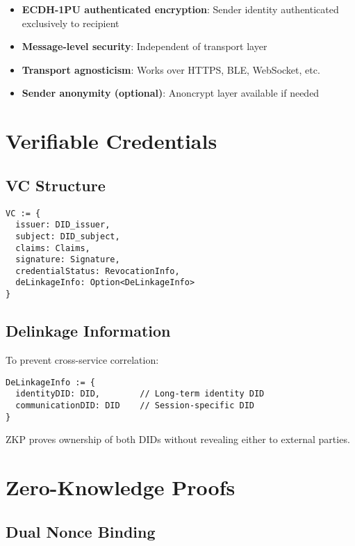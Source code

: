 \begin{itemize}
  \item \textbf{ECDH-1PU authenticated encryption}: Sender identity authenticated exclusively to recipient
  \item \textbf{Message-level security}: Independent of transport layer
  \item \textbf{Transport agnosticism}: Works over HTTPS, BLE, WebSocket, etc.
  \item \textbf{Sender anonymity (optional)}: Anoncrypt layer available if needed
\end{itemize}

\section{Verifiable Credentials}

\subsection{VC Structure}

\begin{verbatim}
VC := {
  issuer: DID_issuer,
  subject: DID_subject,
  claims: Claims,
  signature: Signature,
  credentialStatus: RevocationInfo,
  deLinkageInfo: Option<DeLinkageInfo>
}
\end{verbatim}

\subsection{Delinkage Information}

To prevent cross-service correlation:

\begin{verbatim}
DeLinkageInfo := {
  identityDID: DID,        // Long-term identity DID
  communicationDID: DID    // Session-specific DID
}
\end{verbatim}

ZKP proves ownership of both DIDs without revealing either to external parties.

\section{Zero-Knowledge Proofs}

\subsection{Dual Nonce Binding}

